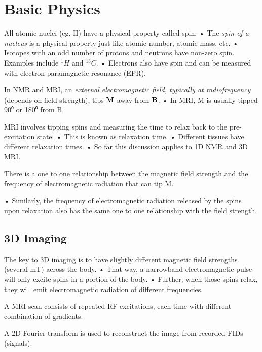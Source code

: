 \documentclass[UTF8,a4paper,11pt]{book}
\theoremstyle{mystyle}{
  \newtheorem{example}{Example}
}
\begin{document}
\section{Basic Physics}
 All atomic nuclei (eg. H) have a physical
property called spin.
• The \emph{spin of a nucleus} is a physical property
just like atomic number, atomic mass, etc.
• Isotopes with an odd number of protons and
neutrons have non-zero spin. Examples include ${^1 H}$ and $^{13} C$.
• Electrons also have spin and can be measured
with electron paramagnetic resonance (EPR).

 In NMR and MRI, an \emph{external electromagnetic
field, typically at radiofrequency} (depends on
field strength), tips $\vb{M}$ away from $\vb{B}$.
• In MRI, M is usually tipped 90⁰ or 180⁰ from B.

 MRI involves tipping spins and measuring the
time to relax back to the pre-excitation state.
• This is known as relaxation time.
• Different tissues have different relaxation
times.
• So far this discussion applies to 1D NMR and
3D MRI.

 There is a one to one relationship between
the magnetic field strength and the frequency
of electromagnetic radiation that can tip M.

• Similarly, the frequency of electromagnetic
radiation released by the spins upon
relaxation also has the same one to one
relationship with the field strength.


\subsection{3D Imaging}
 The key to 3D imaging is to have slightly
different magnetic field strengths (several mT)
across the body.
• That way, a narrowband electromagnetic
pulse will only excite spins in a portion of the
body.
• Further, when those spins relax, they will emit
electromagnetic radiation of different
frequencies.


 A MRI scan consists of repeated RF excitations,
each time with different combination of
gradients.

 A 2D Fourier transform is used to reconstruct
the image from recorded FIDs (signals).
\end{document}
